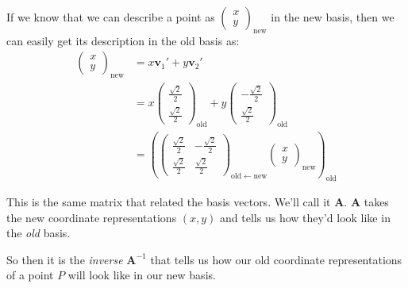 \documentclass[../master.tex]{subfiles}
\begin{document}
	If we know that we can describe a point as $\begin{pmatrix}
					x \\ y
		\end{pmatrix}_{\text{new}}$
	in the new basis, then we can easily get its description in the old basis as:
	\begin{equation}\label{eq:ContravariantTransform}
		\begin{aligned}
			\begin{pmatrix}
						x \\ y
			\end{pmatrix}_{\mathrm{new}} 
			&= x \mathbf v_1' + y \mathbf v_2' \\
			&= x \begin{pmatrix}
				\frac{\sqrt 2}{2} \\ \frac{\sqrt 2}{2}
			\end{pmatrix}_{\mathrm{old}} 
			+ y \begin{pmatrix}
				-\frac{\sqrt 2}{2} \\ \frac{\sqrt 2}{2}
			\end{pmatrix}_{\mathrm{old}}
			\\ &=\left( \begin{pmatrix}
				 \frac{\sqrt 2}{2} &  -\frac{\sqrt 2}{2} \\
				 \frac{\sqrt 2}{2} &  \frac{\sqrt 2}{2}
			\end{pmatrix}_{\mathrm{old} \leftarrow \mathrm{new}}
			\begin{pmatrix}
						x \\ y
			\end{pmatrix}_{\mathrm{new}} \right)_{\mathrm{old}} 
		\end{aligned}
	\end{equation}
	
	This is the same matrix that related the basis vectors. We'll call it $\mathbf A$. $\mathbf A$ takes the new coordinate representations $(x,y)$ and tells us how they'd look like in the \emph{old} basis. 

	
	So then it is the \emph{inverse} $\mathbf A^{-1}$ that tells us how our old coordinate representations of a point $P$ will look like in our new basis.
	
\end{document}
